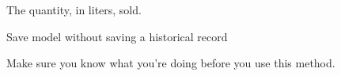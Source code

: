 \documentclass[letterpaper,10pt,english]{sphinxmanual}
\begin{document}
\begin{fulllineitems}
\begin{fulllineitems}
\label{\detokenize{modules/models:gestion.models.KegHistory.quantitySold}}
The quantity, in liters, sold.

\end{fulllineitems}


\begin{fulllineitems}
\label{\detokenize{modules/models:gestion.models.KegHistory.save_without_historical_record}}
Save model without saving a historical record

Make sure you know what you’re doing before you use this method.

\end{fulllineitems}


\end{fulllineitems}

\end{document}
